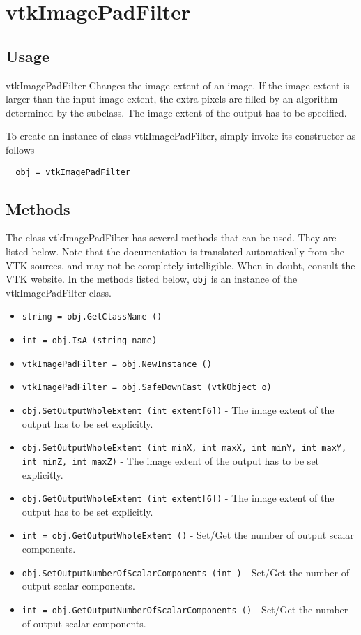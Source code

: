 \section{vtkImagePadFilter}

\subsection{Usage}

 vtkImagePadFilter Changes the image extent of an image.  If the image
 extent is larger than the input image extent, the extra pixels are
 filled by an algorithm determined by the subclass.
 The image extent of the output has to be specified.

To create an instance of class vtkImagePadFilter, simply
invoke its constructor as follows
\begin{verbatim}
  obj = vtkImagePadFilter
\end{verbatim}
\subsection{Methods}

The class vtkImagePadFilter has several methods that can be used.
  They are listed below.
Note that the documentation is translated automatically from the VTK sources,
and may not be completely intelligible.  When in doubt, consult the VTK website.
In the methods listed below, \verb|obj| is an instance of the vtkImagePadFilter class.
\begin{itemize}
\item  \verb|string = obj.GetClassName ()|

\item  \verb|int = obj.IsA (string name)|

\item  \verb|vtkImagePadFilter = obj.NewInstance ()|

\item  \verb|vtkImagePadFilter = obj.SafeDownCast (vtkObject o)|

\item  \verb|obj.SetOutputWholeExtent (int extent[6])| -  The image extent of the output has to be set explicitly.

\item  \verb|obj.SetOutputWholeExtent (int minX, int maxX, int minY, int maxY, int minZ, int maxZ)| -  The image extent of the output has to be set explicitly.

\item  \verb|obj.GetOutputWholeExtent (int extent[6])| -  The image extent of the output has to be set explicitly.

\item  \verb|int = obj.GetOutputWholeExtent ()| -  Set/Get the number of output scalar components.

\item  \verb|obj.SetOutputNumberOfScalarComponents (int )| -  Set/Get the number of output scalar components.

\item  \verb|int = obj.GetOutputNumberOfScalarComponents ()| -  Set/Get the number of output scalar components.

\end{itemize}

